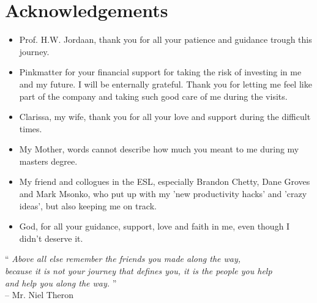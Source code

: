 \chapter*{Acknowledgements}
\makeatletter{}\makeatother

\begin{itemize}
	\item Prof. H.W. Jordaan, thank you for all your patience and guidance trough this journey.
	\item Pinkmatter for your financial support for taking the risk of investing in me and my future. 
	I will be enternally grateful. Thank you for letting me feel like part of the company and taking such good care of me during the visits.
	\item Clarissa, my wife, thank you for all your love and support during the difficult times.
	\item My Mother, words cannot describe how much you meant to me during my masters degree.
	\item My friend and collogues in the ESL, especially Brandon Chetty, Dane Groves and Mark Msonko, who put up with my 'new productivity hacks' and 'crazy ideas', but also keeping me on track.
	\item God, for all your guidance, support, love and faith in me, even though I didn't deserve it.
\end{itemize}
\begin{centering}

	
{\LARGE``} \textit{Above all else remember the friends you made along the way,}\\
\textit{because it is not your journey that defines you, it is the people you help}\\
\textit{and help you along the way.} {\LARGE''}\\
-- Mr. Niel Theron\\


\end{centering}